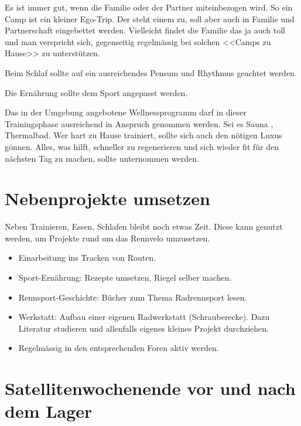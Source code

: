 \documentclass[a4paper,DIV13,BCOR0cm]{scrartcl}
\newcommand{\rv}{Rennvelo}
\begin{document}
Es ist immer gut, wenn die Familie oder der Partner miteinbezogen wird.
So ein Camp ist ein kleiner Ego-Trip. Der steht einem zu, soll aber auch in Familie und Partnerschaft eingebettet werden.
Vielleicht findet die Familie das ja auch toll und man verspricht sich, gegenseitig regelmässig bei solchen <<Camps zu Hause>> zu unterstützen.

Beim Schlaf sollte auf ein ausreichendes Pensum und Rhythmus geachtet werden.

Die Ernährung sollte dem Sport angepasst werden.

Das in der Umgebung angebotene Wellnessprogramm darf in dieser Trainingsphase ausreichend in Anspruch genommen werden.
Sei es Sauna \cite[S. 795]{Weineck2010}, Thermalbad.
Wer hart zu Hause trainiert, sollte sich auch den nötigen Luxus gönnen.
Alles, was hilft, schneller zu regenerieren und sich wieder fit für den nächsten Tag zu machen, sollte unternommen werden.

% 
% 

\section{Nebenprojekte umsetzen}

Neben Trainieren, Essen, Schlafen bleibt noch etwas Zeit.
Diese kann genutzt werden, um Projekte rund um das \rv{} umzusetzen.

\begin{itemize}
        \item Einarbeitung ins Tracken von Routen.
        \item Sport-Ernährung: Rezepte umsetzen, Riegel selber machen.
        \item Rennsport-Geschichte: Bücher zum Thema Radrennsport lesen.
        \item Werkstatt: Aufbau einer eigenen Radwerkstatt (Schrauberecke).
                Dazu Literatur studieren und allenfalls eigenes kleines Projekt durchziehen.
        \item Regelmässig in den entsprechenden Foren aktiv werden.
\end{itemize}


\section{Satellitenwochenende vor und nach dem Lager}
\label{sec:satellitenwochenende}
\end{document}
